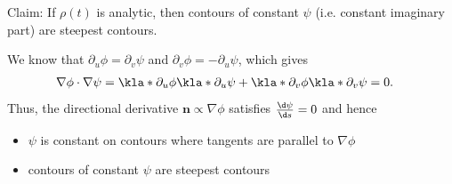 \documentclass[english, parskip=full]{scrbook}
\newcommand{\definition}[2]{\begin{tcolorbox}[colback=colorbackgrounddefinition,colframe=colordefinition, breakable,enhanced,title=\textbf{#1}.]#2\end{tcolorbox}}
\begin{document}
Claim: If $\rho(t)$ is analytic, then contours of constant $\psi$ (i.e. constant imaginary part) are steepest contours.
\definition{Cauchy-Riemann}{We know that $\partial_u \phi = \partial_v\psi$ and $\partial_v \phi = -\partial_u\psi$, which gives
\begin{align}
\nabla\phi \cdot \nabla\psi &= \kla*{\partial_u \phi} \kla*{\partial_u \psi} + \kla*{\partial_v \phi} \kla*{\partial_v \psi} = 0.
\end{align}
Thus, the directional derivative $\textbf{n}\propto \nabla\phi$ satisfies $\frac{\d \psi}{\d s} = 0$ and hence
\begin{itemize}
\item $\psi$ is constant on contours where tangents are parallel to $\nabla\phi$
\item contours of constant $\psi$ are steepest contours
\end{itemize}
}
\end{document}
